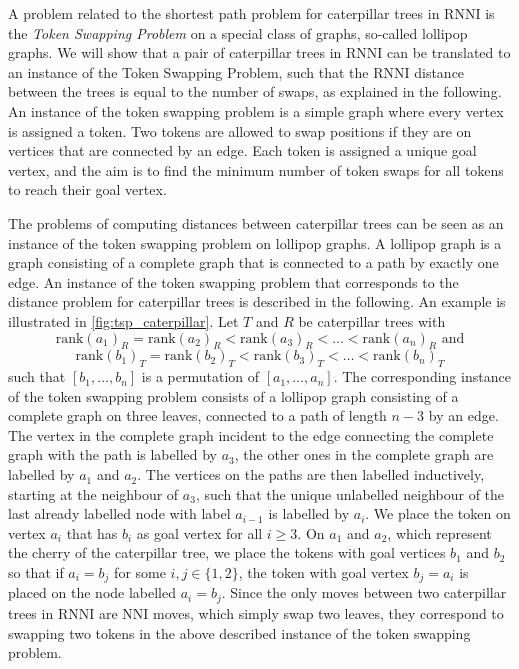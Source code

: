 \documentclass[11pt]{amsart}
\newcommand{\rnni}{\mathrm{RNNI}}
\newcommand{\rank}{\mathrm{rank}}
\newcommand{\nni}{\mathrm{NNI}}
\begin{document}
A problem related to the shortest path problem for caterpillar trees in $\rnni$ is the \emph{Token Swapping Problem} \autocite{Kawahara2017-ey} on a special class of graphs, so-called lollipop graphs.
We will show that a pair of caterpillar trees in $\rnni$ can be translated to an instance of the Token Swapping Problem, such that the $\rnni$ distance between the trees is equal to the number of swaps, as explained in the following.
An instance of the token swapping problem is a simple graph where every vertex is assigned a token.
Two tokens are allowed to swap positions if they are on vertices that are connected by an edge.
Each token is assigned a unique goal vertex, and the aim is to find the minimum number of token swaps for all tokens to reach their goal vertex.

The problems of computing distances between caterpillar trees can be seen as an instance of the token swapping problem on lollipop graphs.
A lollipop graph is a graph consisting of a complete graph that is connected to a path by exactly one edge.
An instance of the token swapping problem that corresponds to the distance problem for caterpillar trees is described in the following.
An example is illustrated in \autoref{fig:tsp_caterpillar}.
Let $T$ and $R$ be caterpillar trees with
\[\rank(a_1)_R = \rank(a_2)_R < \rank(a_3)_R < \ldots < \rank(a_n)_R \text{ and}\]
\[\rank(b_1)_T = \rank(b_2)_T < \rank(b_3)_T < \ldots < \rank(b_n)_T\]
such that $[b_1, \ldots, b_n]$ is a permutation of $[a_1, \ldots, a_n]$.
The corresponding instance of the token swapping problem consists of a lollipop graph consisting of a complete graph on three leaves, connected to a path of length $n-3$ by an edge.
The vertex in the complete graph incident to the edge connecting the complete graph with the path is labelled by $a_3$, the other ones in the complete graph are labelled by $a_1$ and $a_2$.
The vertices on the paths are then labelled inductively, starting at the neighbour of $a_3$, such that the unique unlabelled neighbour of the last already labelled node with label $a_{i-1}$ is labelled by $a_i$.
We place the token on vertex $a_i$ that has $b_i$ as goal vertex for all $i \geq 3$.
On $a_1$ and $a_2$, which represent the cherry of the caterpillar tree, we place the tokens with goal vertices $b_1$ and $b_2$ so that if $a_i = b_j$ for some $i,j \in \{1,2\}$, the token with goal vertex $b_j=a_i$ is placed on the node labelled $a_i=b_j$. 
Since the only moves between two caterpillar trees in $\rnni$ are $\nni$ moves, which simply swap two leaves, they correspond to swapping two tokens in the above described instance of the token swapping problem.
\end{document}
